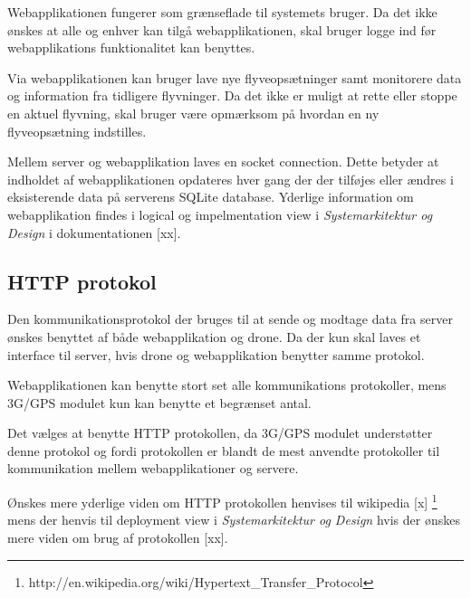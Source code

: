 Webapplikationen fungerer som grænseflade til systemets bruger. Da det ikke ønskes at alle og enhver kan tilgå webapplikationen, skal bruger logge ind før webapplikations funktionalitet kan benyttes. 

Via webapplikationen kan bruger lave nye flyveopsætninger samt monitorere data og information fra tidligere flyvninger. Da det ikke er muligt at rette eller stoppe en aktuel flyvning, skal bruger være opmærksom på hvordan en ny flyveopsætning indstilles. 

Mellem server og webapplikation laves en socket connection. Dette betyder at indholdet af webapplikationen opdateres hver gang der der tilføjes eller ændres i eksisterende data på serverens SQLite database. Yderlige information om webapplikation findes i logical og impelmentation view i \textit{Systemarkitektur og Design} i dokumentationen [xx].


\subsection{HTTP protokol}

Den kommunikationsprotokol der bruges til at sende og modtage data fra server ønskes benyttet af både webapplikation og drone. Da der kun skal laves et interface til server, hvis drone og webapplikation benytter samme protokol.

Webapplikationen kan benytte stort set alle kommunikations protokoller, mens 3G/GPS modulet kun kan benytte et begrænset antal.

Det vælges at benytte HTTP protokollen, da 3G/GPS modulet understøtter denne protokol og fordi protokollen er blandt de mest anvendte protokoller til kommunikation mellem webapplikationer og servere.

Ønskes mere yderlige viden om HTTP protokollen henvises til wikipedia [x] \footnote{http://en.wikipedia.org/wiki/Hypertext\_Transfer\_Protocol} mens der henvis til deployment view i \textit{Systemarkitektur og Design} hvis der ønskes mere viden om brug af protokollen [xx]. 